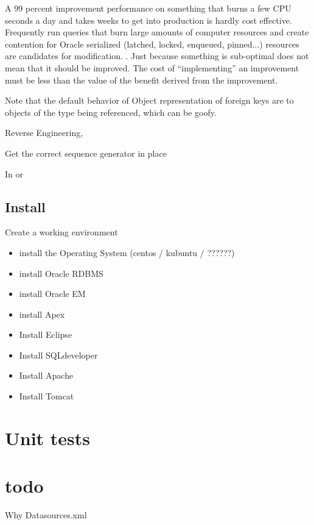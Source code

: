 A 99 percent improvement performance on something that burns a few CPU seconds a day and takes weeks to get into production is 
hardly cost effective.   Frequently run queries that burn large amounts of computer resources and create contention for Oracle 
serialized (latched, locked, enqueued, pinned...) resources are candidates for modification.
.
Just because something is sub-optimal does not mean that it should be improved.
The cost of ``implementing'' an improvement must be less than the value of the benefit derived from the improvement.  



Note that the default behavior of Object representation of  foreign keys are to objects of the type being referenced, which can be goofy.



Reverse Engineering,

Get the correct sequence generator in place



In or
\subsection{Install}
Create a working environment
\begin{itemize}

\item install the Operating System (centos / kubuntu / ??????)

\item install Oracle RDBMS
\item install Oracle EM
\item install Apex
\item Install Eclipse
\item Install SQLdeveloper
\item Install Apache
\item Install Tomcat

\end{itemize}



\section{Unit tests}







\section{todo}
Why Datasources.xml

